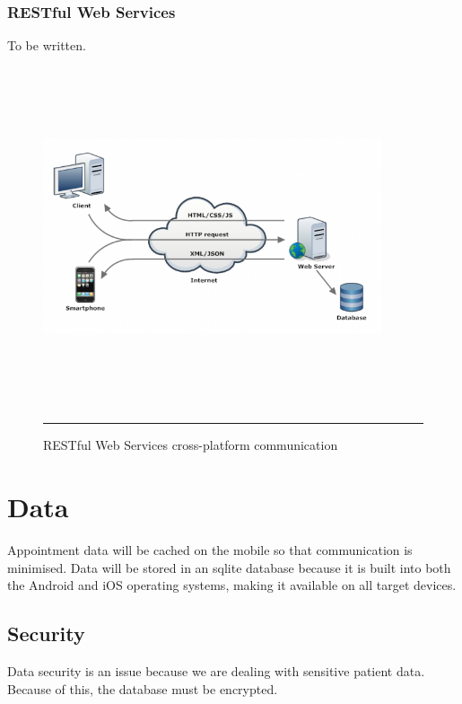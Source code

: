 \subsubsection{RESTful Web Services}

To be written.

\begin{figure}[htbp]
	\centering
\includegraphics[width=10cm,height=10cm,keepaspectratio]{Figures/rest.png}
		\rule{35em}{0.5pt}
	\caption[RESTful Web Services cross-platform communication]{RESTful Web Services cross-platform communication}
	\label{fig:rest}
\end{figure}



\section{Data}

Appointment data will be cached on the mobile so that communication is minimised. Data will be stored in an sqlite database because it is built into both the Android and iOS operating systems, making it available on all target devices.

\subsection{Security}

Data security is an issue because we are dealing with sensitive patient data. Because of this, the database must be encrypted.

